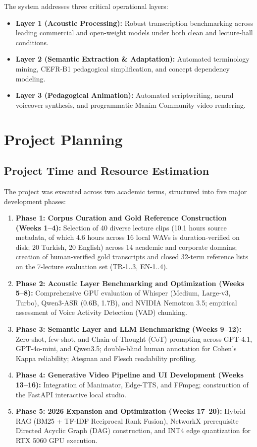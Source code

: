 \documentclass[a4paper,12pt]{report}
\begin{document}
The system addresses three critical operational layers:
\begin{itemize}
    \item \textbf{Layer 1 (Acoustic Processing):} Robust transcription benchmarking across leading commercial and open-weight models under both clean and lecture-hall conditions.
    \item \textbf{Layer 2 (Semantic Extraction \& Adaptation):} Automated terminology mining, CEFR-B1 pedagogical simplification, and concept dependency modeling.
    \item \textbf{Layer 3 (Pedagogical Animation):} Automated scriptwriting, neural voiceover synthesis, and programmatic Manim Community video rendering.
\end{itemize}

\section{Project Planning}

\subsection{Project Time and Resource Estimation}
The project was executed across two academic terms, structured into five major development phases:
\begin{enumerate}
    \item \textbf{Phase 1: Corpus Curation and Gold Reference Construction (Weeks 1--4):} Selection of 40 diverse lecture clips (10.1 hours source metadata, of which 4.6 hours across 16 local WAVs is duration-verified on disk; 20 Turkish, 20 English) across 14 academic and corporate domains; creation of human-verified gold transcripts and closed 32-term reference lists on the 7-lecture evaluation set (TR-1..3, EN-1..4).
    \item \textbf{Phase 2: Acoustic Layer Benchmarking and Optimization (Weeks 5--8):} Comprehensive GPU evaluation of Whisper (Medium, Large-v3, Turbo), Qwen3-ASR (0.6B, 1.7B), and NVIDIA Nemotron 3.5; empirical assessment of Voice Activity Detection (VAD) chunking.
    \item \textbf{Phase 3: Semantic Layer and LLM Benchmarking (Weeks 9--12):} Zero-shot, few-shot, and Chain-of-Thought (CoT) prompting across GPT-4.1, GPT-4o-mini, and Qwen3.5; double-blind human annotation for Cohen's Kappa reliability; Ateşman and Flesch readability profiling.
    \item \textbf{Phase 4: Generative Video Pipeline and UI Development (Weeks 13--16):} Integration of Manimator, Edge-TTS, and FFmpeg; construction of the FastAPI interactive local studio.
    \item \textbf{Phase 5: 2026 Expansion and Optimization (Weeks 17--20):} Hybrid RAG (BM25 + TF-IDF Reciprocal Rank Fusion), NetworkX prerequisite Directed Acyclic Graph (DAG) construction, and INT4 edge quantization for RTX 5060 GPU execution.
\end{enumerate}
\end{document}
